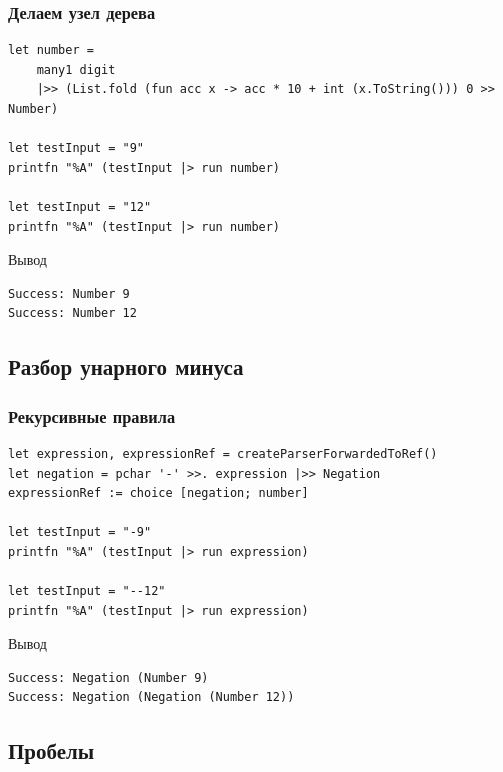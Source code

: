 \documentclass{../../slides-style}
\begin{document}
    \begin{frame}[fragile]
        \frametitle{Делаем узел дерева}
        \begin{verbatim}
let number = 
    many1 digit 
    |>> (List.fold (fun acc x -> acc * 10 + int (x.ToString())) 0 >> Number)

let testInput = "9"
printfn "%A" (testInput |> run number)

let testInput = "12"
printfn "%A" (testInput |> run number)
        \end{verbatim}

        \begin{exampleblock}{Вывод}
            \begin{verbatim}
Success: Number 9
Success: Number 12
            \end{verbatim}
        \end{exampleblock}
    \end{frame}

    \subsection{Разбор унарного минуса}

    \begin{frame}[fragile]
        \frametitle{Рекурсивные правила}
        \begin{verbatim}
let expression, expressionRef = createParserForwardedToRef()
let negation = pchar '-' >>. expression |>> Negation
expressionRef := choice [negation; number]

let testInput = "-9"
printfn "%A" (testInput |> run expression)

let testInput = "--12"
printfn "%A" (testInput |> run expression)
        \end{verbatim}

        \begin{exampleblock}{Вывод}
            \begin{verbatim}
Success: Negation (Number 9)
Success: Negation (Negation (Number 12))
            \end{verbatim}
        \end{exampleblock}
    \end{frame}

    \subsection{Пробелы}
\end{document}
